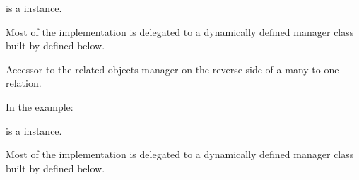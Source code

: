 \documentclass[letterpaper,10pt,english]{sphinxmanual}
\begin{document}
\begin{fulllineitems}
\begin{fulllineitems}
 is a  instance.

Most of the implementation is delegated to a dynamically defined manager
class built by  defined below.

\end{fulllineitems}


\begin{fulllineitems}
\label{\detokenize{modules/models:gestion.models.Product.futp}}
Accessor to the related objects manager on the reverse side of a
many-to-one relation.

In the example:

\begin{sphinxVerbatim}[commandchars=\\\{\}]
 
       
\end{sphinxVerbatim}

 is a  instance.

Most of the implementation is delegated to a dynamically defined manager
class built by  defined below.

\end{fulllineitems}


\begin{fulllineitems}
\label{\detokenize{modules/models:gestion.models.Product.get_category_display}}
\end{fulllineitems}



\end{fulllineitems}
\end{document}
